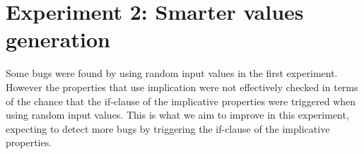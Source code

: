 \chapter{Experiment 2: Smarter values generation}
\label{cpt:experiment2}
Some bugs were found by using random input values in the first experiment. However the properties that use implication were not effectively checked in terms of the chance that the if-clause of the implicative properties were triggered when using random input values. This is what we aim to improve in this experiment, expecting to detect more bugs by triggering the if-clause of the implicative properties.

